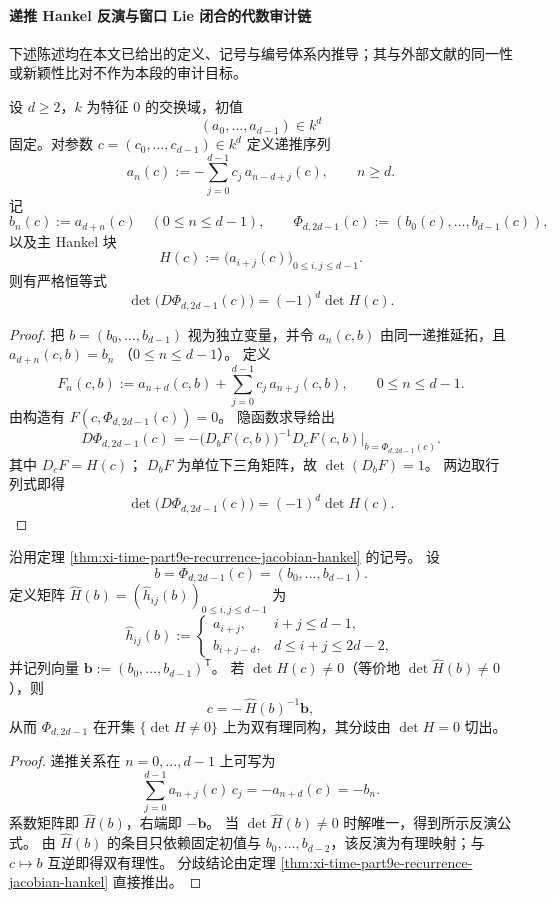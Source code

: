 \paragraph{递推 Hankel 反演与窗口 Lie 闭合的代数审计链}
下述陈述均在本文已给出的定义、记号与编号体系内推导；其与外部文献的同一性或新颖性比对不作为本段的审计目标。

\begin{theorem}\label{thm:xi-time-part9e-recurrence-jacobian-hankel}
设 \(d\ge 2\)，\(k\) 为特征 \(0\) 的交换域，初值
\[
(a_0,\dots,a_{d-1})\in k^d
\]
固定。对参数
\(
c=(c_0,\dots,c_{d-1})\in k^d
\)
定义递推序列
\[
a_n(c):=-\sum_{j=0}^{d-1}c_j\,a_{n-d+j}(c),\qquad n\ge d.
\]
记
\[
b_n(c):=a_{d+n}(c)\quad(0\le n\le d-1),\qquad
\Phi_{d,2d-1}(c):=(b_0(c),\dots,b_{d-1}(c)),
\]
以及主 Hankel 块
\[
H(c):=\bigl(a_{i+j}(c)\bigr)_{0\le i,j\le d-1}.
\]
则有严格恒等式
\[
\det\!\bigl(D\Phi_{d,2d-1}(c)\bigr)=(-1)^d\det H(c).
\]
\end{theorem}
\begin{proof}
把 \(b=(b_0,\dots,b_{d-1})\) 视为独立变量，并令 \(a_n(c,b)\) 由同一递推延拓，且
\(
a_{d+n}(c,b)=b_n
\)
（\(0\le n\le d-1\)）。
定义
\[
F_n(c,b):=a_{n+d}(c,b)+\sum_{j=0}^{d-1}c_j\,a_{n+j}(c,b),\qquad 0\le n\le d-1.
\]
由构造有 \(F(c,\Phi_{d,2d-1}(c))=0\)。
隐函数求导给出
\[
D\Phi_{d,2d-1}(c)
=-\bigl(D_bF(c,b)\bigr)^{-1}D_cF(c,b)\big|_{b=\Phi_{d,2d-1}(c)}.
\]
其中 \(D_cF=H(c)\)；
\(D_bF\) 为单位下三角矩阵，故 \(\det(D_bF)=1\)。
两边取行列式即得
\[
\det\!\bigl(D\Phi_{d,2d-1}(c)\bigr)
=(-1)^d\det H(c).
\]
\end{proof}

\begin{corollary}[递推系数的显式有理反演与双有理性]\label{cor:xi-time-part9e-recurrence-rational-inversion}
沿用定理 \ref{thm:xi-time-part9e-recurrence-jacobian-hankel} 的记号。
设
\[
b=\Phi_{d,2d-1}(c)=(b_0,\dots,b_{d-1}).
\]
定义矩阵 \(\widehat H(b)=(\widehat h_{ij}(b))_{0\le i,j\le d-1}\) 为
\[
\widehat h_{ij}(b):=
\begin{cases}
a_{i+j}, & i+j\le d-1,\\[2mm]
b_{i+j-d}, & d\le i+j\le 2d-2,
\end{cases}
\]
并记列向量 \(\mathbf b:=(b_0,\dots,b_{d-1})^{\mathsf T}\)。
若 \(\det H(c)\neq 0\)（等价地 \(\det\widehat H(b)\neq 0\)），则
\[
c=-\,\widehat H(b)^{-1}\mathbf b,
\]
从而 \(\Phi_{d,2d-1}\) 在开集 \(\{\det H\neq 0\}\) 上为双有理同构，其分歧由 \(\det H=0\) 切出。
\end{corollary}
\begin{proof}
递推关系在 \(n=0,\dots,d-1\) 上可写为
\[
\sum_{j=0}^{d-1}a_{n+j}(c)\,c_j=-a_{n+d}(c)=-b_n.
\]
系数矩阵即 \(\widehat H(b)\)，右端即 \(-\mathbf b\)。
当 \(\det\widehat H(b)\neq 0\) 时解唯一，得到所示反演公式。
由 \(\widehat H(b)\) 的条目只依赖固定初值与 \(b_0,\dots,b_{d-2}\)，该反演为有理映射；与 \(c\mapsto b\) 互逆即得双有理性。
分歧结论由定理 \ref{thm:xi-time-part9e-recurrence-jacobian-hankel} 直接推出。
\end{proof}

